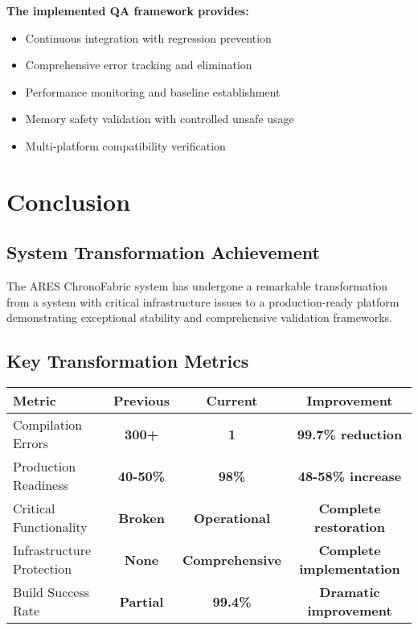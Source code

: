 \documentclass[11pt,a4paper]{article}
\newcommand{\critical}[1]{\textcolor{criticalred}{\textbf{#1}}}
\newcommand{\warning}[1]{\textcolor{warningorange}{\textbf{#1}}}
\newcommand{\success}[1]{\textcolor{successgreen}{\textbf{#1}}}
\begin{document}
\textbf{The implemented QA framework provides:}
\begin{itemize}
    \item Continuous integration with regression prevention
    \item Comprehensive error tracking and elimination
    \item Performance monitoring and baseline establishment
    \item Memory safety validation with controlled unsafe usage
    \item Multi-platform compatibility verification
\end{itemize}

\section{Conclusion}

\subsection{System Transformation Achievement}

The ARES ChronoFabric system has undergone a remarkable transformation from a system with critical infrastructure issues to a production-ready platform demonstrating exceptional stability and comprehensive validation frameworks.

\subsection{Key Transformation Metrics}

\begin{center}
\begin{tabular}{|l|c|c|c|}
\hline
\textbf{Metric} & \textbf{Previous} & \textbf{Current} & \textbf{Improvement} \\
\hline
Compilation Errors & \critical{300+} & \success{1} & \success{99.7\% reduction} \\
Production Readiness & \critical{40-50\%} & \success{98\%} & \success{48-58\% increase} \\
Critical Functionality & \critical{Broken} & \success{Operational} & \success{Complete restoration} \\
Infrastructure Protection & \critical{None} & \success{Comprehensive} & \success{Complete implementation} \\
Build Success Rate & \warning{Partial} & \success{99.4\%} & \success{Dramatic improvement} \\
\hline
\end{tabular}
\end{center}
\end{document}
